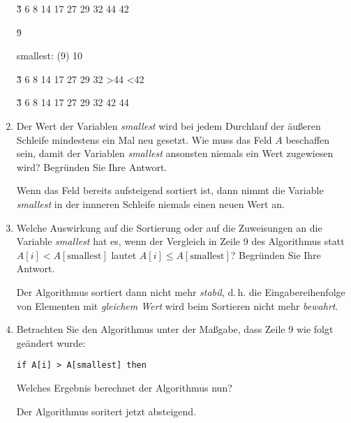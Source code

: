 \documentclass{lehramt-informatik-aufgabe}
\begin{document}
\begin{enumerate}
\begin{liAntwort}
\v{3 6 8 14 17 27 29 32 44 42}

%

\u{9}

smallest: (9) 10

\v{3 6 8 14 17 27 29 32 >44 <42}

%


\v{3 6 8 14 17 27 29 32 42 44}

\end{liAntwort}

%

\item Der Wert der Variablen \emph{smallest} wird bei jedem Durchlauf
der äußeren Schleife mindestens ein Mal neu gesetzt. Wie muss das Feld
$A$ beschaffen sein, damit der Variablen \emph{smallest} ansonsten
niemals ein Wert zugewiesen wird? Begründen Sie Ihre Antwort.

\begin{liAntwort}
Wenn das Feld bereits aufsteigend sortiert ist, dann nimmt die Variable
\emph{smallest} in der innneren Schleife niemals einen neuen Wert an.
\end{liAntwort}

%

\item Welche Auswirkung auf die Sortierung oder auf die Zuweisungen an
die Variable \emph{smallest} hat es, wenn der Vergleich in Zeile 9 des
Algorithmus statt $A[i] < A[\text{smallest}]$ lautet $A[i] \leq
A[\text{smallest}]$? Begründen Sie Ihre Antwort.

\begin{liAntwort}
Der Algorithmus sortiert dann nicht mehr \emph{stabil}, d.\,h. die
Eingabereihenfolge von Elementen mit \emph{gleichem Wert} wird beim
Sortieren nicht mehr \emph{bewahrt}.
\end{liAntwort}

%

\item Betrachten Sie den Algorithmus unter der Maßgabe, dass Zeile 9 wie
folgt geändert wurde:

\begin{verbatim}
if A[i] > A[smallest] then
\end{verbatim}

Welches Ergebnis berechnet der Algorithmus nun?

\begin{liAntwort}
Der Algorithmus soritert jetzt absteigend.
\end{liAntwort}


\end{enumerate}
\end{document}
